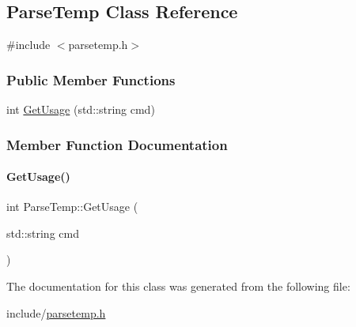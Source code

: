 \hypertarget{classParseTemp}{}\subsection{Parse\+Temp Class Reference}
\label{classParseTemp}


{\ttfamily \#include $<$parsetemp.\+h$>$}

\subsubsection*{Public Member Functions}
\begin{DoxyCompactItemize}
\item 
int \mbox{\hyperlink{classParseTemp_a8ec133a4da11cf376bb9c72397e9ae15}{Get\+Usage}} (std\+::string cmd)
\end{DoxyCompactItemize}


\subsubsection{Member Function Documentation}
\mbox{\label{classParseTemp_a8ec133a4da11cf376bb9c72397e9ae15}} 
\paragraph{\texorpdfstring{GetUsage()}{GetUsage()}}
{\footnotesize\ttfamily int Parse\+Temp\+::\+Get\+Usage (\begin{DoxyParamCaption}\item[{std\+::string}]{cmd }\end{DoxyParamCaption})\hspace{0.3cm}{\ttfamily [inline]}}



The documentation for this class was generated from the following file\+:\begin{DoxyCompactItemize}
\item 
include/\mbox{\hyperlink{parsetemp_8h}{parsetemp.\+h}}\end{DoxyCompactItemize}
